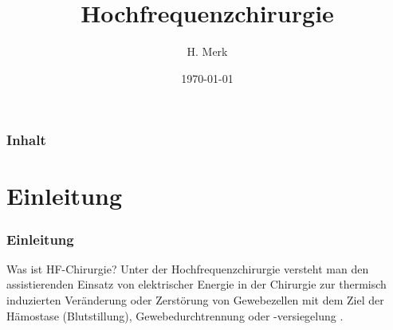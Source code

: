 \documentclass{beamer}
\begin{document}
\title[HF-Chirurgie]{Hochfrequenzchirurgie}
\author{H. Merk}
\date{\today}

\begin{frame}
\maketitle
\end{frame}


\begin{frame}
\frametitle{Inhalt}
\tableofcontents
\end{frame}



\section{Einleitung}
\begin{frame}
\frametitle{Einleitung}
	\begin{block}{Was ist HF-Chirurgie?}
		Unter der Hochfrequenzchirurgie versteht man den assistierenden Einsatz von elektrischer Energie in der Chirurgie zur thermisch induzierten Veränderung oder Zerstörung von Gewebezellen mit dem Ziel der Hämostase (Blutstillung), Gewebedurchtrennung oder -versiegelung \cite{kramme2016medizintechnik}.
	\end{block}
	\begin{minipage}[t]{0.49\textwidth}
	\end{minipage}
	\begin{minipage}[t]{0.49\textwidth}
	\end{minipage}
\end{frame}
\end{document}
